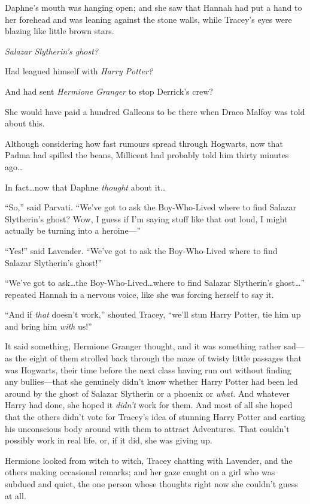 Daphne’s mouth was hanging open; and she saw that Hannah had put a hand to her forehead and was leaning against the stone walls, while Tracey’s eyes were blazing like little brown stars.

\emph{Salazar Slytherin’s ghost?}

Had leagued himself with \emph{Harry Potter?}

And had sent \emph{Hermione Granger} to stop Derrick’s crew?

She would have paid a hundred Galleons to be there when Draco Malfoy was told about this.

Although considering how fast rumours spread through Hogwarts, now that Padma had spilled the beans, Millicent had probably told him thirty minutes ago…

In fact…now that Daphne \emph{thought} about it…

“So,” said Parvati. “We’ve got to ask the Boy-Who-Lived where to find Salazar Slytherin’s ghost? Wow, I guess if I’m saying stuff like that out loud, I might actually be turning into a heroine—”

“Yes!” said Lavender. “We’ve got to ask the Boy-Who-Lived where to find Salazar Slytherin’s ghost!”

“We’ve got to ask…the Boy-Who-Lived…where to find Salazar Slytherin’s ghost…” repeated Hannah in a nervous voice, like she was forcing herself to say it.

“And if \emph{that} doesn’t work,” shouted Tracey, “we’ll stun Harry Potter, tie him up and bring him \emph{with} us!”

\later

It said something, Hermione Granger thought, and it was something rather sad—as the eight of them strolled back through the maze of twisty little passages that was Hogwarts, their time before the next class having run out without finding any bullies—that she genuinely didn’t know whether Harry Potter had been led around by the ghost of Salazar Slytherin or a phoenix or \emph{what.} And whatever Harry had done, she hoped it \emph{didn’t} work for them. And most of all she hoped that the others didn’t vote for Tracey’s idea of stunning Harry Potter and carting his unconscious body around with them to attract Adventures. That couldn’t possibly work in real life, or, if it did, she was giving up.

Hermione looked from witch to witch, Tracey chatting with Lavender, and the others making occasional remarks; and her gaze caught on a girl who was subdued and quiet, the one person whose thoughts right now she couldn’t guess at all.

